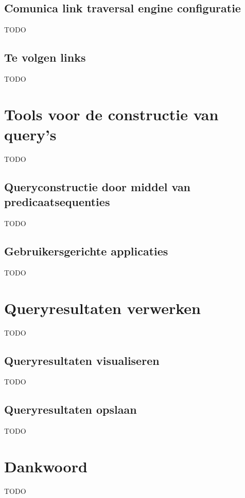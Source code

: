 \documentclass[conference]{IEEEtran}
\begin{document}
\subsection{Comunica link traversal engine configuratie}
TODO

\subsection{Te volgen links}
TODO

\section{Tools voor de constructie van query's}
TODO

\subsection{Queryconstructie door middel van predicaatsequenties}
TODO

\subsection{Gebruikersgerichte applicaties}
TODO

\section{Queryresultaten verwerken}
TODO

\subsection{Queryresultaten visualiseren}
TODO

\subsection{Queryresultaten opslaan}
TODO

\section*{Dankwoord}
TODO

% 
% 
\end{document}
